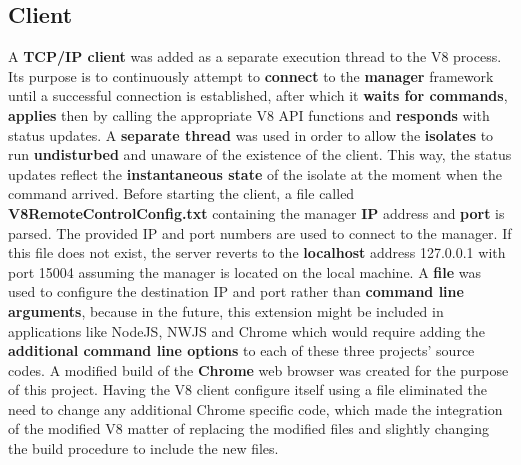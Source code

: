 \documentclass{l4proj}
\begin{document}
\subsection{Client}
\hspace*{1em} A \textbf{TCP/IP client} was added as a separate execution thread to the V8 process. Its purpose is to continuously attempt to \textbf{connect} to the \textbf{manager} framework until a successful connection is established, after which it \textbf{waits for commands}, \textbf{applies} then by calling the appropriate V8 API functions and \textbf{responds} with status updates. A \textbf{separate thread} was used in order to allow the \textbf{isolates} to run \textbf{undisturbed} and unaware of the existence of the client. This way, the status updates reflect the \textbf{instantaneous state} of the isolate at the moment when the command arrived. Before starting the client, a file called \textbf{V8RemoteControlConfig.txt} containing the manager \textbf{IP} address and \textbf{port} is parsed. The provided IP and port numbers are used to connect to the manager. If this file does not exist, the server reverts to the \textbf{localhost} address 127.0.0.1 with port 15004 assuming the manager is located on the local machine. A \textbf{file} was used to configure the destination IP and port rather than \textbf{command line arguments}, because in the future, this extension might be included in applications like NodeJS, NWJS and Chrome which would require adding the \textbf{additional command line options} to each of these three projects' source codes. A modified build of the \textbf{Chrome} web browser was created for the purpose of this project. Having the V8 client configure itself using a file eliminated the need to change any additional Chrome specific code, which made the integration of the modified V8 matter of replacing the modified files and slightly changing the build procedure to include the new files.
\end{document}
